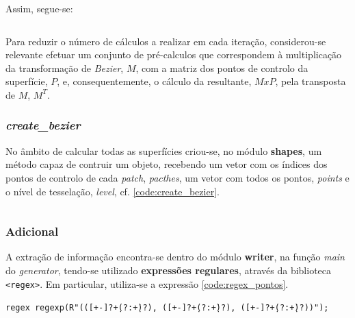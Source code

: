 \documentclass[relatorio.tex]{subfiles}
\begin{document}
Assim, segue-se:
\begin{code}
    \label{code:BezierTriangles.h}
    \inputminted[firstline=5, lastline=15]{cpp}{../../cartesian/BezierTriangles.h}
\end{code}

Para reduzir o número de cálculos a realizar em cada iteração,
considerou-se relevante efetuar um conjunto de pré-calculos que
correspondem à multiplicação da transformação de \textit{Bezier}, $M$, com a matriz dos pontos de controlo da superfície, $P$,
e, consequentemente, o cálculo da resultante, $MxP$, pela transposta de $M$, $M^T$.

\subsubsection{\textit{create\_bezier}}
No âmbito de calcular todas as superfícies criou-se, no módulo \textbf{shapes}, 
um método capaz de contruir um objeto, recebendo um vetor com os índices dos pontos de controlo
de cada \textit{patch}, \textit{pacthes},
um vetor com todos os pontos, \textit{points} e o nível de tesselação, \textit{level},
cf. \ref{code:create_bezier}.

\begin{code}
    \label{code:create_bezier}
    \inputminted[firstline=44, lastline=44]{cpp}{../../generator/shapes.h}
\end{code}

\subsubsection{Adicional}

A extração de informação encontra-se dentro do módulo \textbf{writer}, na função \textit{main} do \textit{generator},
tendo-se utilizado \textbf{expressões regulares}, através da biblioteca \texttt{<regex>}.
Em particular, utiliza-se a expressão \ref{code:regex_pontos}.
\begin{code}
\label{code:regex_pontos}
\texttt{regex regexp(R"(([+-]?\d+(?:\.\d+)?), ([+-]?\d+(?:\.\d+)?), ([+-]?\d+(?:\.\d+)?))");}
\end{code}
\end{document}
